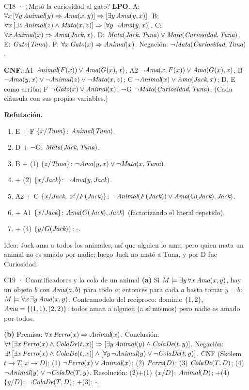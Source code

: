 \begin{solucion}{C18 · ¿Mató la curiosidad al gato?}
\textbf{LPO.} A: $\forall x\,[\forall y\,\textit{Animal}(y)\Rightarrow\textit{Ama}(x,y)]\Rightarrow[\exists y\,\textit{Ama}(y,x)]$.
B: $\forall x\,[\exists z\,\textit{Animal}(z)\wedge\textit{Mata}(x,z)]\Rightarrow[\forall y\,\neg\textit{Ama}(y,x)]$.
C: $\forall x\,\textit{Animal}(x)\Rightarrow\textit{Ama}(\textit{Jack},x)$.
D: $\textit{Mata}(\textit{Jack},\textit{Tuna})\vee\textit{Mata}(\textit{Curiosidad},\textit{Tuna})$.
E: $\textit{Gato}(\textit{Tuna})$. F: $\forall x\,\textit{Gato}(x)\Rightarrow\textit{Animal}(x)$.
Negación: $\neg\textit{Mata}(\textit{Curiosidad},\textit{Tuna})$.

\textbf{CNF.} A1 $\textit{Animal}(F(x))\vee\textit{Ama}(G(x),x)$; A2 $\neg\textit{Ama}(x,F(x))\vee\textit{Ama}(G(x),x)$;
B $\neg\textit{Ama}(y,x)\vee\neg\textit{Animal}(z)\vee\neg\textit{Mata}(x,z)$; C $\neg\textit{Animal}(x)\vee\textit{Ama}(\textit{Jack},x)$;
D, E como arriba; F $\neg\textit{Gato}(x)\vee\textit{Animal}(x)$; ¬G $\neg\textit{Mata}(\textit{Curiosidad},\textit{Tuna})$.
(Cada cláusula con sus propias variables.)

\textbf{Refutación.}
\begin{enumerate}[nosep]
\item E + F $\{x/\textit{Tuna}\}$: $\textit{Animal}(\textit{Tuna})$.
\item D + ¬G: $\textit{Mata}(\textit{Jack},\textit{Tuna})$.
\item B + (1) $\{z/\textit{Tuna}\}$: $\neg\textit{Ama}(y,x)\vee\neg\textit{Mata}(x,\textit{Tuna})$.
\item + (2) $\{x/\textit{Jack}\}$: $\neg\textit{Ama}(y,\textit{Jack})$.
\item A2 + C $\{x/\p{Jack},\ x'/F(\p{Jack})\}$: $\neg\textit{Animal}(F(\textit{Jack}))\vee\textit{Ama}(G(\textit{Jack}),\textit{Jack})$.
\item + A1 $\{x/\textit{Jack}\}$: $\textit{Ama}(G(\textit{Jack}),\textit{Jack})$ (factorizando el literal repetido).
\item + (4) $\{y/G(\textit{Jack})\}$: $\square$.
\end{enumerate}
Idea: Jack ama a todos los animales, así que alguien lo ama; pero quien mata un animal no es amado por
nadie; luego Jack no mató a Tuna, y por D fue Curiosidad.
\end{solucion}

\begin{solucion}{C19 · Cuantificadores y la cola de un animal}
\textbf{(a)} Si $M\models\exists y\,\forall x\,\textit{Ama}(x,y)$, hay un objeto $b$ con $\textit{Ama}(a,b)$ para todo $a$; entonces para
cada $a$ basta tomar $y=b$: $M\models\forall x\,\exists y\,\textit{Ama}(x,y)$. Contramodelo del recíproco: dominio $\{1,2\}$,
$\textit{Ama}=\{(1,1),(2,2)\}$: todos aman a alguien (a sí mismos) pero nadie es amado por todos.

\textbf{(b)} Premisa: $\forall x\,\textit{Perro}(x)\Rightarrow\textit{Animal}(x)$. Conclusión:
$\forall t\,[\exists x\,\textit{Perro}(x)\wedge\textit{ColaDe}(t,x)]\Rightarrow[\exists y\,\textit{Animal}(y)\wedge\textit{ColaDe}(t,y)]$.
Negación: $\exists t\,[\exists x\,\textit{Perro}(x)\wedge\textit{ColaDe}(t,x)]\wedge[\forall y\,\neg\textit{Animal}(y)\vee\neg\textit{ColaDe}(t,y)]$.
CNF (Skolem $t\to T$, $x\to D$): (1) $\neg\textit{Perro}(x)\vee\textit{Animal}(x)$; (2) $\textit{Perro}(D)$; (3) $\textit{ColaDe}(T,D)$;
(4) $\neg\textit{Animal}(y)\vee\neg\textit{ColaDe}(T,y)$.
Resolución: (2)+(1) $\{x/D\}$: $\textit{Animal}(D)$; +(4) $\{y/D\}$: $\neg\textit{ColaDe}(T,D)$; +(3): $\square$.
\end{solucion}

